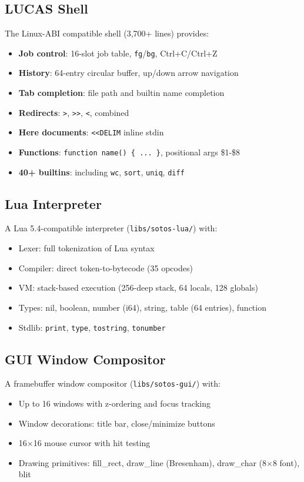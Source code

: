 \documentclass[11pt,letterpaper]{article}
\theoremstyle{definition}
\begin{document}
\subsection{LUCAS Shell}

The Linux-ABI compatible shell (3,700+ lines) provides:
\begin{itemize}[nosep]
    \item \textbf{Job control}: 16-slot job table, \texttt{fg}/\texttt{bg}, Ctrl+C/Ctrl+Z
    \item \textbf{History}: 64-entry circular buffer, up/down arrow navigation
    \item \textbf{Tab completion}: file path and builtin name completion
    \item \textbf{Redirects}: \texttt{>}, \texttt{>>}, \texttt{<}, combined
    \item \textbf{Here documents}: \texttt{<<DELIM} inline stdin
    \item \textbf{Functions}: \texttt{function name() \{ ... \}}, positional args \$1-\$8
    \item \textbf{40+ builtins}: including \texttt{wc}, \texttt{sort}, \texttt{uniq}, \texttt{diff}
\end{itemize}

\subsection{Lua Interpreter}

A Lua 5.4-compatible interpreter (\texttt{libs/sotos-lua/}) with:
\begin{itemize}[nosep]
    \item Lexer: full tokenization of Lua syntax
    \item Compiler: direct token-to-bytecode (35 opcodes)
    \item VM: stack-based execution (256-deep stack, 64 locals, 128 globals)
    \item Types: nil, boolean, number (i64), string, table (64 entries), function
    \item Stdlib: \texttt{print}, \texttt{type}, \texttt{tostring}, \texttt{tonumber}
\end{itemize}

\subsection{GUI Window Compositor}

A framebuffer window compositor (\texttt{libs/sotos-gui/}) with:
\begin{itemize}[nosep]
    \item Up to 16 windows with z-ordering and focus tracking
    \item Window decorations: title bar, close/minimize buttons
    \item 16$\times$16 mouse cursor with hit testing
    \item Drawing primitives: fill\_rect, draw\_line (Bresenham), draw\_char (8$\times$8 font), blit
\end{itemize}
\end{document}

